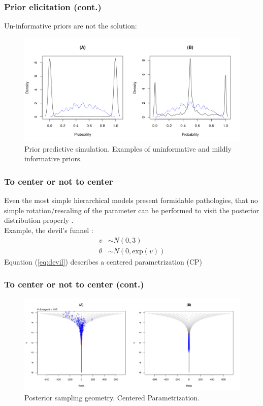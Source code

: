 \documentclass[arial,12pt,xcolor=dvipsnames]{beamer}
\begin{document}
\begin{frame}
	\frametitle{Prior elicitation (cont.)}
	Un-informative priors are not the solution:
	\begin{figure}[!h]
		\centering
		\includegraphics[width=1\textwidth]{prior_elicitation}
		\caption{Prior predictive simulation. Examples of uninformative and mildly informative priors.}
		\label{fig:prior_elicitation}
	\end{figure}
\end{frame}
%
\begin{frame}
	\frametitle{To center or not to center}
	Even the most simple hierarchical models present formidable pathologies, that no simple rotation/rescaling of the parameter can be performed to visit the posterior distribution properly \cite{Betancourt_et_al_2013}. \\
	\vspace{0.3cm} Example, the devil's funnel \cite{McElreath_2020}:
	\begin{equation} \label{eq:devil}
		\begin{split}	
			v &\sim N(0, 3) \\
			\theta &\sim N(0, \text{exp}(v))
		\end{split}
	\end{equation}
	Equation (\ref{eq:devil}) describes a centered parametrization (CP)
\end{frame}
%
\begin{frame}
	\frametitle{To center or not to center (cont.)}
	\begin{figure}[h]
		\centering
		\includegraphics[width=1\linewidth]{1_funnel_CE_simple}
		\caption{Posterior sampling geometry. Centered Parametrization.}
		\label{fig:devil_CE_geom}
	\end{figure}
\end{frame}
\end{document}
